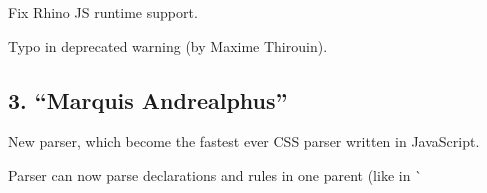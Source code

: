 \begin{DoxyItemize}
\item Fix Rhino JS runtime support.
\item Typo in deprecated warning (by Maxime Thirouin).
\end{DoxyItemize}

\subsection*{3. “\+Marquis Andrealphus”}


\begin{DoxyItemize}
\item New parser, which become the fastest ever C\+SS parser written in Java\+Script.
\item Parser can now parse declarations and rules in one parent (like in \`{} 
\end{DoxyItemize}